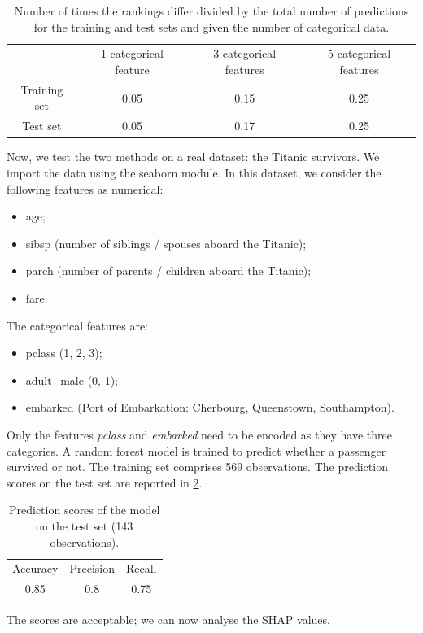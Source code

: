 \documentclass[11pt]{article}
\begin{document}
\begin{table}[H]
    \centering
    \begin{tabular}{cccc}
      \midrule
      & 1 categorical feature & 3 categorical features & 5 categorical features \\
      Training set & 0.05 & 0.15 & 0.25 \\
      Test set & 0.05 & 0.17 & 0.25 \\
      \bottomrule
    \end{tabular}
    \caption{Number of times the rankings differ divided by the total number of
     predictions for the training and test sets and given the number of categorical data.}
    \label{table:rankings}
  \end{table}

Now, we test the two methods on a real dataset: the Titanic survivors. We import the data 
using the seaborn module. In this dataset, we consider the following features as numerical: 
\begin{itemize}
    \item age;
    \item sibsp (number of siblings / spouses aboard the Titanic);
    \item parch (number of parents / children aboard the Titanic);
    \item fare.
\end{itemize}
The categorical features are:
\begin{itemize}
    \item pclass (1, 2, 3);
    \item adult\_male (0, 1); 
    \item embarked (Port of Embarkation: Cherbourg, Queenstown, Southampton).
\end{itemize}

Only the features \textit{pclass} and \textit{embarked} need to be encoded as they have three categories.
A random forest model is trained to predict whether a passenger survived or not. The training set 
comprises 569 observations. The prediction scores on the test set are reported in \ref{table:score_titanic}.

\begin{table}[H]
    \centering
    \begin{tabular}{ccc}
      \midrule
      Accuracy & Precision & Recall \\
      0.85 & 0.8 & 0.75 \\
      \bottomrule
    \end{tabular}
    \caption{Prediction scores of the model on the test set (143 observations).}
    \label{table:score_titanic}
  \end{table}
The scores are acceptable; we can now analyse the SHAP values.
\end{document}
